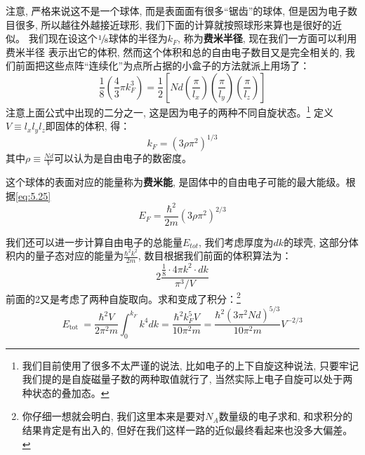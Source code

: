 \documentclass[a4paper,zihao=-4,linespread=1]{ctexrep}
\begin{document}
    注意, 严格来说这不是一个球体, 而是表面面有很多“锯齿”的球体, 但是因为电子数目很多, 所以越往外越接近球形, 我们下面的计算就按照球形来算也是很好的近似。
    我们现在设这个${\raise0.5ex\hbox{$\scriptstyle 1$}\kern-0.1em/\kern-0.15em\lower0.25ex\hbox{$\scriptstyle 8$}}$球体的半径为$k_F$, 称为\textbf{费米半径}, 现在我们一方面可以利用费米半径
    表示出它的体积, 然而这个体积和总的自由电子数目又是完全相关的, 我们前面把这些点阵“连续化”为点所占据的小盒子的方法就派上用场了：
    \begin{equation}
        \frac{1}{8}\left(\frac{4}{3}\pi k_F^3\right)=\frac{1}{2}\left[Nd\left(\frac{\pi}{l_x}\right)\left(\frac{\pi}{l_y}\right)\left(\frac{\pi}{l_z}\right)\right]
    \end{equation}
    注意上面公式中出现的二分之一, 这是因为电子的两种不同自旋状态。\footnote{我们目前使用了很多不太严谨的说法, 比如电子的上下自旋这种说法, 只要牢记我们提的是自旋磁量子数的两种取值就行了, 当然实际上电子自旋可以处于两种状态的叠加态。}
    定义$V\equiv l_xl_yl_z$即固体的体积, 得：
    \begin{equation}
        \label{eq:5.27}
        k_{F}=\left(3 \rho \pi^{2}\right)^{1 / 3}
    \end{equation}
    其中$\rho\equiv\frac{Nd}{V}$可以认为是自由电子的数密度。

    这个球体的表面对应的能量称为\textbf{费米能}, 是固体中的自由电子可能的最大能级。根据\ref{eq:5.25}
    \begin{equation}
        \label{eq:5.28}
        E_{F}=\frac{\hbar^{2}}{2 m}\left(3 \rho \pi^{2}\right)^{2 / 3}
    \end{equation}

    我们还可以进一步计算自由电子的总能量$E_{tot}$, 我们考虑厚度为$dk$的球壳, 这部分体积内的量子态对应的能量为$\frac{\hbar^2k^2}{2m}$, 数目根据我们前面的体积算法为：
    \begin{equation}
        2\frac{\frac{1}{8}\cdot4\pi k^2\cdot dk}{\pi^3/V}
    \end{equation}
    前面的2又是考虑了两种自旋取向。求和变成了积分：\footnote{你仔细一想就会明白, 我们这里本来是要对$N_A$数量级的电子求和, 和求积分的结果肯定是有出入的, 但好在我们这样一路的近似最终看起来也没多大偏差。}
    \begin{equation}
        \label{eq:5.30}
        E_{\text {tot }}=\frac{\hbar^{2} V}{2 \pi^{2} m} \int_{0}^{k_{F}} k^{4} d k=\frac{\hbar^{2} k_{F}^{5} V}{10 \pi^{2} m}=\frac{\hbar^{2}\left(3 \pi^{2} N d\right)^{5 / 3}}{10 \pi^{2} m} V^{-2 / 3}
    \end{equation}
\end{document}
